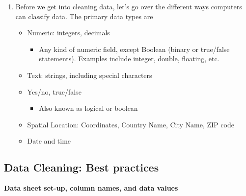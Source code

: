 \documentclass[
]{book}
\providecommand{\tightlist}{%
  \setlength{\itemsep}{0pt}\setlength{\parskip}{0pt}}
\begin{document}
\begin{enumerate}
\def\labelenumi{\arabic{enumi}.}
\item
  Before we get into cleaning data, let's go over the different ways computers can classify data. The primary data types are

  \begin{itemize}
  \item
    Numeric: integers, decimals

    \begin{itemize}
    \tightlist
    \item
      Any kind of numeric field, except Boolean (binary or true/false statements). Examples include integer, double, floating, etc.
    \end{itemize}
  \item
    Text: strings, including special characters
  \item
    Yes/no, true/false

    \begin{itemize}
    \tightlist
    \item
      Also known as logical or boolean
    \end{itemize}
  \item
    Spatial Location: Coordinates, Country Name, City Name, ZIP code
  \item
    Date and time
  \end{itemize}
\end{enumerate}

\hypertarget{data-cleaning-best-practices}{%
\subsection{Data Cleaning: Best practices}\label{data-cleaning-best-practices}}

\textbf{Data sheet set-up, column names, and data values}
\end{document}
